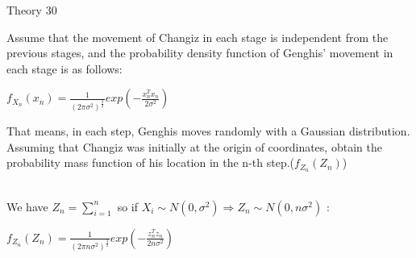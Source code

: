 \documentclass[30pt]{article}
\begin{document}
{\Large \color{blue} Theory 30 } \\
{\color{blue} Assume that the movement of Changiz in each stage is independent from the previous stages, and the probability density function of Genghis' movement in each stage is as follows: 
\begin{center}
    $f_{X_n}(x_n) = \frac{1}{(2\pi \sigma^2)^\frac{3}{2}}exp(-\frac{x_n^Tx_n}{2\sigma^2}) $
\end{center}
That means, in each step, Genghis moves randomly with a Gaussian distribution. \\
Assuming that Changiz was initially at the origin of coordinates, obtain the probability mass function of his location in the n-th step.($f_{Z_n}(Z_n) $)
} \\ \newline 
We have $Z_n = \sum_{i=1}^{n} $ so if $X_i \sim N(0,\sigma^2) \Rightarrow Z_n \sim N(0,n\sigma^2) $ : 
\begin{center}
    $f_{Z_n}(Z_n) = \frac{1}{(2\pi n\sigma^2)^\frac{3}{2}}exp(-\frac{z_n^Tz_n}{2n\sigma^2})$
\end{center}
\end{document}
